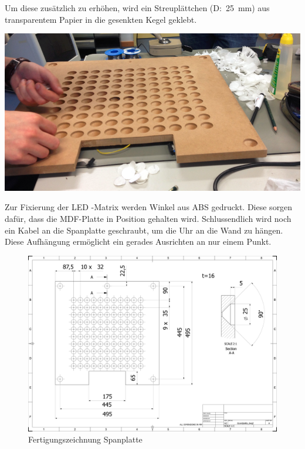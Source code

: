 \begin{multicols}{2}
{}
Um diese zusätzlich zu erhöhen, wird ein Streuplättchen (D:~25~mm) aus transparentem Papier in die gesenkten Kegel geklebt.

{
\centering
\includegraphics[width=0.85\columnwidth]{Abbildungen/Konstruktion/LED02}

}

Zur Fixierung der LED -Matrix werden Winkel aus ABS gedruckt. Diese sorgen dafür, dass die MDF-Platte in Position gehalten wird. Schlussendlich wird noch ein Kabel an die Spanplatte geschraubt, um die Uhr an die Wand zu hängen. Diese Aufhängung ermöglicht ein gerades Ausrichten an nur einem Punkt.


\end{multicols}

\begin{landscape}
	\begin{figure}
		\centering
		\includegraphics[width=21cm]{Abbildungen/Konstruktion/Grundplatte}
		\caption[Spanplatte]{Fertigungszeichnung Spanplatte}
		\label{fig:Spanplatte}
	\end{figure}
\end{landscape}


